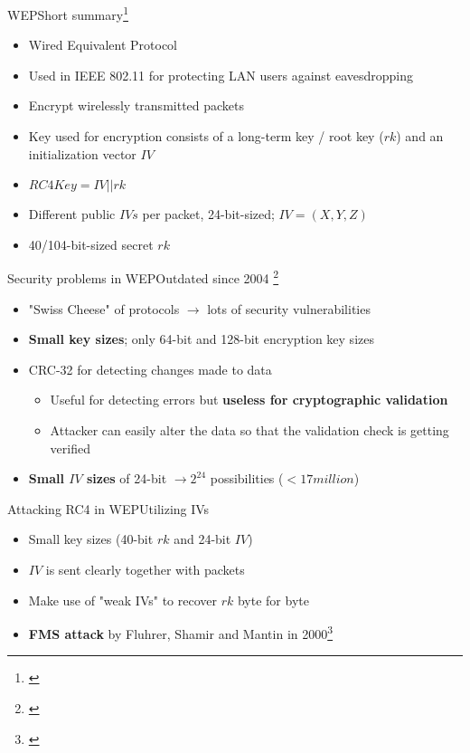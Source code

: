 \documentclass[
	aspectratio=169,	%
	onlytextwidth,		%
	t					%
	]{beamer}
\begin{document}
\begin{frame}[fragile]{WEP}{Short summary\footnote[frame]{\cite{wepproblems}}}
	\begin{itemize}
		\item Wired Equivalent Protocol
		\item Used in IEEE 802.11 for protecting LAN users against eavesdropping
		\item Encrypt wirelessly transmitted packets
		\item Key used for encryption consists of a long-term key / root key ($rk$) and an initialization vector $IV$
		\item $RC4Key = IV||rk$
		\item Different public $IVs$ per packet, 24-bit-sized; $IV=(X,Y,Z)$
		\item 40/104-bit-sized secret $rk$
	\end{itemize}
\end{frame}

\begin{frame}[fragile]{Security problems in WEP}{Outdated since 2004 \footnote[frame]{\cite{wepcracking}}}
	\begin{itemize}
		\item "Swiss Cheese" of protocols $\rightarrow$ lots of security vulnerabilities
		\item \textbf{Small key sizes}; only 64-bit and 128-bit encryption key sizes
		\item CRC-32 for detecting changes made to data
		\begin{itemize}
			\item Useful for detecting errors but \textbf{useless for cryptographic validation}
			\item Attacker can easily alter the data so that the validation check is getting verified
		\end{itemize}
		\item \textbf{Small $IV$ sizes} of 24-bit $\rightarrow 2^{24}$ possibilities ($<17 million$)
	\end{itemize}
\end{frame}

\begin{frame}[fragile]{Attacking RC4 in WEP}{Utilizing IVs}
	\begin{itemize}
		\item Small key sizes (40-bit $rk$ and 24-bit $IV$)
		\item $IV$ is sent clearly together with packets
		\item Make use of "weak IVs" to recover $rk$ byte for byte
		\item \textbf{FMS attack} by Fluhrer, Shamir and Mantin in 2000\footnote[frame]{\cite{fluhrer2001weaknesses}}
	\end{itemize}
\end{frame}
\end{document}
